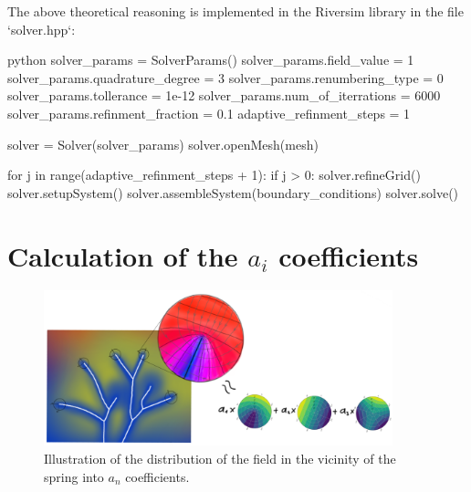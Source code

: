\documentclass[]{pracamgr}
\begin{document}
        The above theoretical reasoning is implemented in the Riversim library in the file `solver.hpp`:
        
        \begin{mintedbox}{python}
          solver_params = SolverParams()
          solver_params.field_value = 1
          solver_params.quadrature_degree = 3
          solver_params.renumbering_type = 0
          solver_params.tollerance = 1e-12
          solver_params.num_of_iterrations =  6000
          solver_params.refinment_fraction = 0.1
          adaptive_refinment_steps = 1
        
          solver = Solver(solver_params)
          solver.openMesh(mesh)
          
          for j in range(adaptive_refinment_steps + 1):
              if j > 0:
                  solver.refineGrid()
              solver.setupSystem()
              solver.assembleSystem(boundary_conditions)
              solver.solve()\end{mintedbox}

    \section{Calculation of the $a_i$ coefficients}
      
      \begin{figure}[H]
        \centering
        \includegraphics[width=0.9\textwidth]{figs/series_params_integration.png}        
        \caption{Illustration of the distribution of the field in the vicinity of the spring into $a_n$ coefficients.}
        \label{series_params_integration}
      \end{figure}
\end{document}
